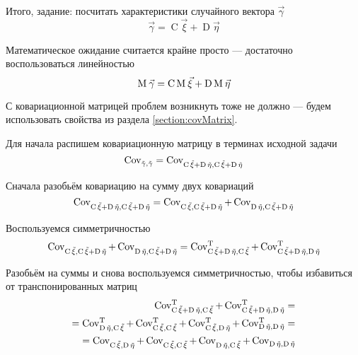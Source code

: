 Итого, задание: посчитать характеристики случайного вектора $\vec{\gamma}$
$$\vec{\gamma} = \operatorname{C} \vec{\xi} + \operatorname{D} \vec{\eta}$$

Математическое ожидание считается крайне просто --- достаточно воспользоваться
линейностью
$$\mean{\vec{\gamma}}
    = \operatorname{C} \mean{\vec{\xi}} + \operatorname{D} \mean{\vec{\eta}}$$

С ковариационной матрицей проблем возникнуть тоже не должно --- будем
использовать свойства из раздела \ref{section:covMatrix}.

Для начала распишем ковариационную матрицу в терминах исходной задачи
$$\dCov{\vec{\gamma}}
    = \dCov{\operatorname{C} \vec{\xi} + \operatorname{D} \vec{\eta}}$$

Сначала разобьём ковариацию на сумму двух ковариаций
$$
\dCov{\operatorname{C} \vec{\xi} + \operatorname{D} \vec{\eta}}
= \Cov{\operatorname{C} \vec{\xi}}{
        \operatorname{C} \vec{\xi} + \operatorname{D} \vec{\eta}}
    + \Cov{\operatorname{D} \vec{\eta}}{
        \operatorname{C} \vec{\xi} + \operatorname{D} \vec{\eta}}
$$

Воспользуемся симметричностью
$$
\Cov{\operatorname{C} \vec{\xi}}{
        \operatorname{C} \vec{\xi} + \operatorname{D} \vec{\eta}}
    + \Cov{\operatorname{D} \vec{\eta}}{
        \operatorname{C} \vec{\xi} + \operatorname{D} \vec{\eta}}
= \Cov[T]{\operatorname{C} \vec{\xi} + \operatorname{D} \vec{\eta}}{
        \operatorname{C} \vec{\xi}}
    + \Cov[T]{\operatorname{C} \vec{\xi} + \operatorname{D} \vec{\eta}}{
        \operatorname{D} \vec{\eta}}
$$

Разобьём на суммы и снова воспользуемся симметричностью, чтобы избавиться
от транспонированных матриц
\begin{align*}
\Cov[T]{\operatorname{C} \vec{\xi} + \operatorname{D} \vec{\eta}}{
        \operatorname{C} \vec{\xi}}
    + \Cov[T]{\operatorname{C} \vec{\xi} + \operatorname{D} \vec{\eta}}{
        \operatorname{D} \vec{\eta}} = \\
= \Cov[T]{\operatorname{D} \vec{\eta}}{\operatorname{C} \vec{\xi}}
    + \Cov[T]{\operatorname{C} \vec{\xi}}{\operatorname{C} \vec{\xi}}
    + \Cov[T]{\operatorname{C} \vec{\xi}}{\operatorname{D} \vec{\eta}}
    + \Cov[T]{\operatorname{D} \vec{\eta}}{\operatorname{D} \vec{\eta}} = \\
= \Cov{\operatorname{C} \vec{\xi}}{\operatorname{D} \vec{\eta}}
    + \Cov{\operatorname{C} \vec{\xi}}{\operatorname{C} \vec{\xi}}
    + \Cov{\operatorname{D} \vec{\eta}}{\operatorname{C} \vec{\xi}}
    + \Cov{\operatorname{D} \vec{\eta}}{\operatorname{D} \vec{\eta}}
\end{align*}

